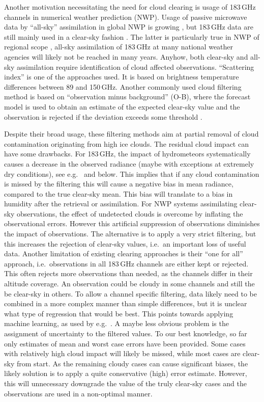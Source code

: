 \documentclass[amt, manuscript]{copernicus}
\begin{document}
Another motivation necessitating the need for cloud clearing is usage of 183\,GHz channels in 
numerical weather prediction (NWP). Usage of passive microwave data by
``all-sky'' assimilation in global NWP is growing \citep{geer2017growing},
but 183\,GHz data are still mainly used in a clear-sky fashion
\citep{geer2018all}. The latter is particularly true in NWP of regional scope
\citep{gustafsson2018survey}, all-sky assimilation of 183\,GHz at many national
weather agencies will likely not be reached in many years. Anyhow, both clear-sky and all-sky assimilation require identification of cloud affected observations. ``Scattering index'' \citep{geer2015scatteringindex} is one of the approaches used. It is based on brightness temperature differences between 89 and 150\,GHz. Another commonly used cloud filtering method is based on ``observation minus background'' (O-B), where the forecast model is used to obtain an estimate of the expected clear-sky value and the observation is rejected if the deviation exceeds some threshold \citep{English1999clouddetection}. 

Despite their broad usage, these filtering methods aim at partial removal of cloud contamination originating from high ice clouds. The residual cloud impact can have some drawbacks. For 183\,GHz, the impact of hydrometeors systematically causes a decrease in the observed radiance (maybe with exceptions at extremely dry conditions), see
e.g.\ \citet{barlakas:three:20} and below. This implies that if any cloud contamination is missed by the filtering this will cause a negative bias in mean radiance, compared to the true clear-sky mean. This bias will translate to a bias in humidity after the retrieval or assimilation. For NWP systems assimilating clear-sky observations, the effect of undetected clouds is overcome by inflating the observational errors. However this artificial suppression of observations diminishes the impact of observations. The alternative is to apply a very strict filtering, but this increases the rejection of clear-sky values, i.e.\ an important loss of useful data. Another limitation of existing clearing approaches is their ``one for all'' approach, i.e.\ observations in all 183\,GHz channels are either kept or rejected. This often rejects more observations than needed, as the channels differ in their altitude coverage. An observation could be cloudy in some channels and still the be clear-sky in others. To allow a channel specific filtering, data likely need to be combined in a more complex manner than simple differences, but it is unclear what type of regression that would be best. This points towards applying machine learning, as used by e.g.\ \citet{favrichon2019detecting}. A maybe less obvious problem is the assignment of uncertainty to the filtered values. To our best knowledge, so far only estimates of mean and worst case errors have been provided. Some cases with relatively high cloud impact will likely be missed, while most cases are clear-sky from start. As the remaining cloudy cases can cause significant biases, the likely solution is to apply a quite conservative (high) error estimate. However, this will unnecessary downgrade the value of the truly clear-sky cases and the observations are used in a non-optimal manner.
\end{document}
